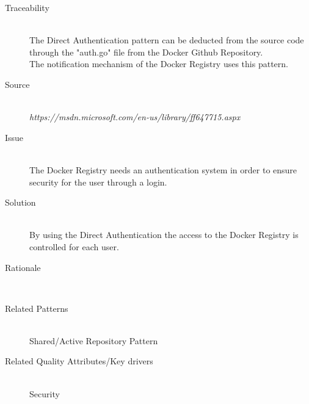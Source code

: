 \begin{description}

\item[Traceability]~\\
The Direct Authentication pattern can be deducted from the source code through the "auth.go" file from the Docker Github Repository. \\
The notification mechanism of the Docker Registry uses this pattern.

\item[Source]~\\
\textit{https://msdn.microsoft.com/en-us/library/ff647715.aspx} \\


\item[Issue]~\\ The Docker Registry needs an authentication system in order to ensure security for the user through a login.


\item[Solution]~\\ By using the Direct Authentication the access to the Docker Registry is controlled for each user.

\item[Rationale]~\\ 

\item [Related Patterns]~\\
Shared/Active Repository Pattern

\item [Related Quality Attributes/Key drivers]~\\
Security

\end{description}

